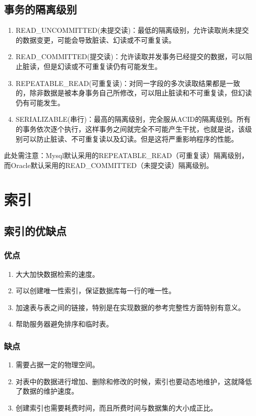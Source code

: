 \subsection{事务的隔离级别}
\begin{enumerate}
    \item READ\_UNCOMMITTED(未提交读)：最低的隔离级别，允许读取尚未提交的数据变更，可能会导致脏读、幻读或不可重复读。
    \item READ\_COMMITTED(提交读)：允许读取并发事务已经提交的数据，可以阻止脏读，但是幻读或不可重复读仍有可能发生。
    \item REPEATABLE\_READ(可重复读)：对同一字段的多次读取结果都是一致的，除非数据是被本身事务自己所修改，可以阻止脏读和不可重复读，但幻读仍有可能发生。
    \item SERIALIZABLE(串行)：最高的隔离级别，完全服从ACID的隔离级别。所有的事务依次逐个执行，这样事务之间就完全不可能产生干扰，也就是说，该级别可以防止脏读、不可重复读以及幻读。但是这将严重影响程序的性能。
\end{enumerate}
此处需注意：Mysql默认采用的REPEATABLE\_READ（可重复读）隔离级别，而Oracle默认采用的READ\_COMMITTED（未提交读）隔离级别。

\section{索引}
\subsection{索引的优缺点}
\subsubsection{优点}
\begin{enumerate}
    \item 大大加快数据检索的速度。
    \item 可以创建唯一性索引，保证数据库每一行的唯一性。
    \item 加速表与表之间的链接，特别是在实现数据的参考完整性方面特别有意义。
    \item 帮助服务器避免排序和临时表。
\end{enumerate}
\subsubsection{缺点}
\begin{enumerate}
    \item 需要占据一定的物理空间。
    \item 对表中的数据进行增加、删除和修改的时候，索引也要动态地维护，这就降低了数据的维护速度。
    \item 创建索引也需要耗费时间，而且所费时间与数据集的大小成正比。
\end{enumerate}

